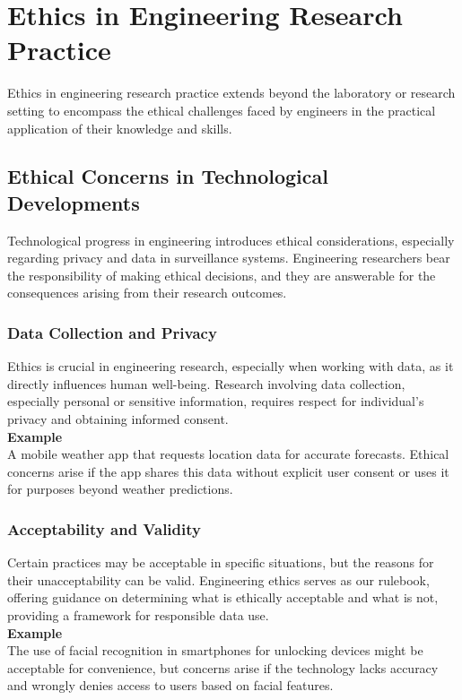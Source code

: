 \documentclass{article}
\begin{document}
	\section{Ethics in Engineering Research Practice}
	Ethics in engineering research practice extends beyond the laboratory or research setting to encompass the
	ethical challenges faced by engineers in the practical application of their knowledge and skills.

	\subsection{Ethical Concerns in Technological Developments}
	Technological progress in engineering introduces ethical considerations, especially regarding privacy and
	data in surveillance systems.
	Engineering researchers bear the responsibility of making ethical decisions, and they are answerable for
	the consequences arising from their research outcomes.

	\subsubsection{Data Collection and Privacy}
	Ethics is crucial in engineering research, especially when working with data, as it directly influences
	human well-being.
	Research involving data collection, especially personal or sensitive information, requires
	respect for individual's privacy and obtaining informed consent. \\

	\noindent \textbf{Example} \\
	A mobile weather app that requests location data for accurate forecasts.
	Ethical concerns arise if the app shares this data without explicit user consent or uses it for purposes
	beyond weather predictions.

	\subsubsection{Acceptability and Validity}
	Certain practices may be acceptable in specific situations, but the reasons for their unacceptability can
	be valid.
	Engineering ethics serves as our rulebook, offering guidance on determining what is ethically acceptable
	and what is not, providing a framework for responsible data use. \\

	\noindent \textbf{Example} \\
	The use of facial recognition in smartphones for unlocking devices might be acceptable for convenience, but
	concerns arise if the technology lacks accuracy and wrongly denies access to users based on facial features.
\end{document}
